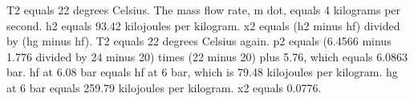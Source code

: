 T2 equals 22 degrees Celsius.
The mass flow rate, m dot, equals 4 kilograms per second.
h2 equals 93.42 kilojoules per kilogram.
x2 equals (h2 minus hf) divided by (hg minus hf).
T2 equals 22 degrees Celsius again.
p2 equals (6.4566 minus 1.776 divided by 24 minus 20) times (22 minus 20) plus 5.76, which equals 6.0863 bar.
hf at 6.08 bar equals hf at 6 bar, which is 79.48 kilojoules per kilogram.
hg at 6 bar equals 259.79 kilojoules per kilogram.
x2 equals 0.0776.